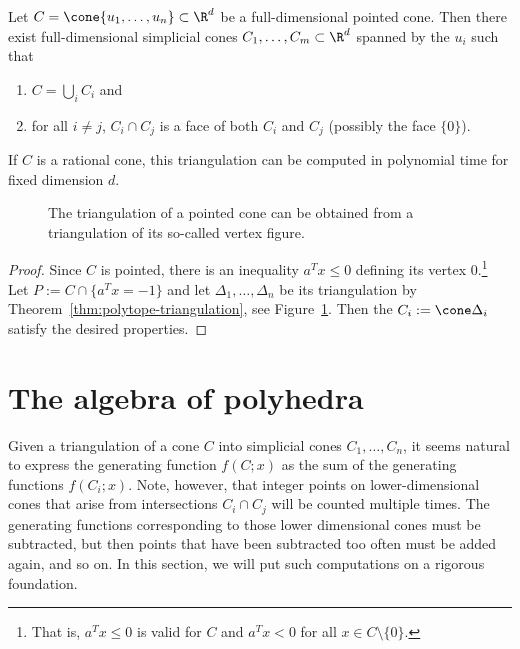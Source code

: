 \begin{corollary}
  \label{corollary:cone-triangulation}
  Let $C = \cone\{ u_1, \ldots, u_n \} \subset \R^d$ be a full-dimensional pointed cone.
  Then there exist full-dimensional simplicial cones $C_1, \ldots, C_m \subset \R^d$ spanned by the $u_i$
  such that
  \begin{enumerate}
    \item $C = \bigcup_i C_i$ and
    \item for all $i \neq j$, $C_i \cap C_j$ is a face of both $C_i$ and $C_j$ (possibly the face $\{ 0 \}$).
  \end{enumerate}
  If $C$ is a rational cone, this triangulation can be computed in polynomial time for fixed dimension $d$.
\end{corollary}
\begin{figure}
  \begin{center}
  \end{center}
  \caption{The triangulation of a pointed cone can be obtained from a triangulation of its so-called vertex figure.}
  \label{fig:triangulation-cone}
\end{figure}
\begin{proof}
  Since $C$ is pointed,
  there is an inequality $a^T x \leq 0$ defining its vertex $0$.\footnote{%
  That is, $a^Tx \leq 0$ is valid for $C$ and $a^Tx < 0$ for all $x \in C \setminus \{ 0 \}$.}
  Let $P := C \cap \{ a^Tx = -1 \}$
  and let $\Delta_1, \ldots, \Delta_n$ be its triangulation by Theorem~\ref{thm:polytope-triangulation},
  see Figure~\ref{fig:triangulation-cone}.
  Then the $C_i := \cone \Delta_i$ satisfy the desired properties.
\end{proof}




\section{The algebra of polyhedra}

Given a triangulation of a cone $C$ into simplicial cones $C_1, \ldots, C_n$,
it seems natural to express the generating function $f(C;x)$ as
the sum of the generating functions $f(C_i;x)$.
Note, however, that integer points on lower-dimensional cones that arise from intersections $C_i \cap C_j$
will be counted multiple times.
The generating functions corresponding to those lower dimensional cones must be subtracted,
but then points that have been subtracted too often must be added again, and so on.
In this section, we will put such computations on a rigorous foundation.

